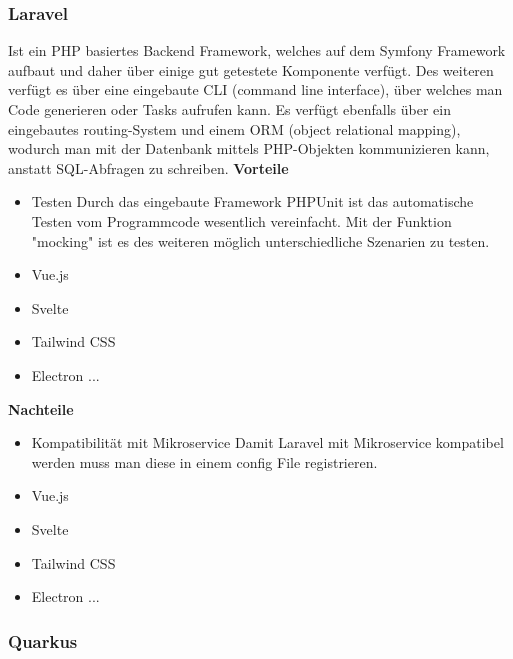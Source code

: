\subsubsection{Laravel}
Ist ein PHP basiertes Backend Framework, welches auf dem Symfony Framework aufbaut und daher über einige gut getestete Komponente verfügt. Des weiteren verfügt es über eine eingebaute CLI (command line interface), über welches man Code generieren oder Tasks aufrufen kann. Es verfügt ebenfalls über ein eingebautes routing-System und einem ORM (object relational mapping), wodurch man mit der Datenbank mittels PHP-Objekten kommunizieren kann, anstatt SQL-Abfragen zu schreiben.
\newline
\textbf{Vorteile}
\begin{itemize}
    \item Testen
        \newline
        Durch das eingebaute Framework PHPUnit ist das automatische Testen vom Programmcode wesentlich vereinfacht. Mit der Funktion "mocking" ist es des weiteren möglich unterschiedliche Szenarien zu testen.
    \item Vue.js
    \item Svelte
    \item Tailwind CSS
    \item Electron ...
\end{itemize}

\textbf{Nachteile}
\begin{itemize}
    \item Kompatibilität mit Mikroservice
        \newline
        Damit Laravel mit Mikroservice kompatibel werden muss man diese in einem config File registrieren.
    \item Vue.js
    \item Svelte
    \item Tailwind CSS
    \item Electron ...
\end{itemize}

\subsubsection{Quarkus}